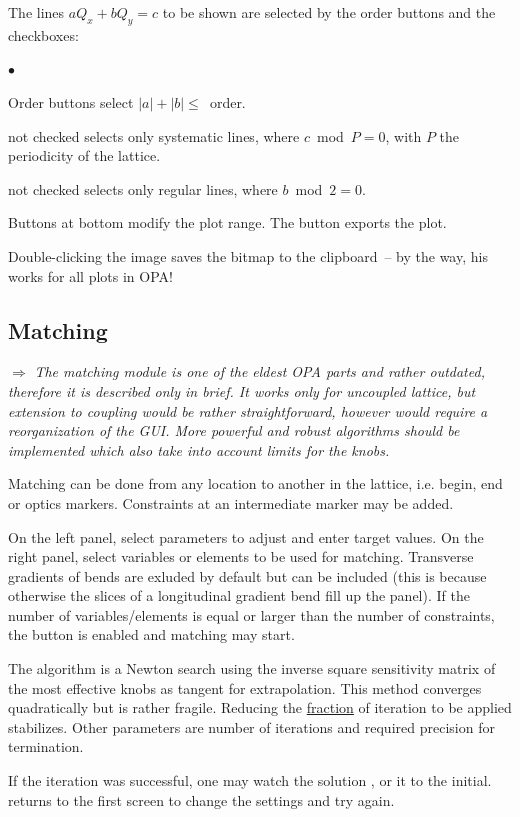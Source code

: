 \documentclass[12pt]{article}
\newenvironment{mylist}
  {\begin{list}{$\bullet$}{\parsep 0pt}}
  {\end{list}}
\newcommand\todo[1]{$\Longrightarrow$ {\em #1} }
\newcommand\button[1]{\fbox{\small\bf #1}}
\newcommand\chkbox[1]{\fbox{\small $\circ\,$#1}}
\newcommand\field[1]{\underline{\small #1}}
\begin{document}
The lines $a Q_x + bQ_y = c$ to be
shown are selected by the order buttons and the checkboxes:
\begin{mylist}
\item Order buttons select $|a|+|b|\leq$~order.
\item \chkbox{nsys} not checked selects only systematic lines, where $c$~mod~$P=0$, with $P$
the periodicity of the lattice.
\item \chkbox{skew} not checked selects only regular lines, where $b$~mod~$2=0$.
\end{mylist}
Buttons at bottom modify the plot range. The \button{EPS} button exports the plot.

Double-clicking the image saves the bitmap to the clipboard~-- by the way, his works for all plots in OPA!


\subsection{\label{ssecmat}Matching}

\todo{The matching module is one of the eldest OPA parts and rather outdated, therefore it is described only in brief. It works only for uncoupled lattice, but extension to coupling would be rather straightforward, however would require a reorganization of the GUI. More powerful and robust algorithms should be implemented which also take into account limits for the knobs.}

Matching can be done from any location to another in the lattice, i.e.
begin, end or optics markers. Constraints at an intermediate marker may
be added. 

On the left panel, select parameters to adjust and enter target values.
On the right panel, select variables or elements to be used for matching. Transverse gradients of bends are exluded by default but can be included (this is because otherwise the slices of a longitudinal gradient bend fill up the panel). If the number
of variables/elements is equal or larger than the number of constraints, the \button{Go} button is enabled and matching may start. 

The algorithm is a Newton search using the
inverse square sensitivity matrix of the most effective knobs as tangent
for extrapolation.
This method converges quadratically but is rather fragile.
Reducing the \field{fraction} of iteration to be applied stabilizes.
Other parameters are number of iterations and required precision for termination.

If the iteration was successful, one may watch the solution \button{show}, \button{accept}
or \button{reset} it to the initial. \button{retry} returns to the first screen to change
the settings and try again.
\end{document}
